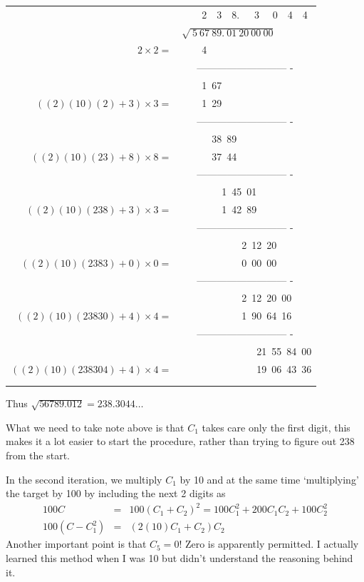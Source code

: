 \documentclass[aps,preprint,preprintnumbers,nofootinbib,showpacs,prd]{revtex4-1}
\newcommand{\nbea}{\begin{eqnarray*}}
\newcommand{\neea}{\end{eqnarray*}}
\begin{document}
{\renewcommand{\arraystretch}{0.2} %
\begin{tabular}{r l}
 & ~~~~2~~3~~8.~~~3~ ~0~~4~~4 \\
 & $\sqrt{~5~67~89.~01~20~00~00}$ \\
 $2 \times 2 =$ & ~~~~4\\
 & ~~~--------------------------- - \\
 & ~~~~1~67 \\
 $((2) (10) (2) + 3) \times 3= $ & ~~~~1~29\\
 & ~~~--------------------------- - \\
 &~~~~~~38~89 \\
 $((2) (10) (23) + 8) \times 8= $ & ~~~~~~37~44\\
  & ~~~--------------------------- - \\
 & ~~~~~~~~1~45~01\\
 $((2) (10) (238) + 3) \times 3= $ & ~~~~~~~~1~42~89\\
 & ~~~--------------------------- - \\
 & ~~~~~~~~~~~~2~12~20\\
 $((2)(10)(2383) + 0) \times 0= $ & ~~~~~~~~~~~~0~00~00\\
 & ~~~--------------------------- - \\
 &~~~~~~~~~~~~2~12~20~00\\
 $((2)(10)(23830) + 4) \times 4= $ &~~~~~~~~~~~~1~90~64~16\\
 & ~~~--------------------------- - \\
 &~~~~~~~~~~~~~~~21~55~84~00\\
 $((2)(10)(238304) + 4) \times 4= $ &~~~~~~~~~~~~~~~19~06~43~36\\\\\\
\end{tabular}
}

Thus $\sqrt{56789.012} = 238.3044 \dots$

What we need to take note above is that $C_1$ takes care only the first digit, this makes it a lot easier to start the procedure, rather than trying to figure out 238 from the start.

In the second iteration, we multiply $C_1$ by 10 and at the same time `multiplying' the target by 100 by including the next 2 digits as
%
\nbea
100C & = & 100(C_1 + C_2)^2 = 100 C_1^2 + 200C_1C_2 + 100 C_2^2 \\
100(C - C_1^2) & = & (2 (10) C_1 + C_2) C_2
\neea
%
Another important point is that $C_5=0$! Zero is apparently permitted. I actually learned this method when I was 10 but didn't understand the reasoning behind it.
\end{document}
